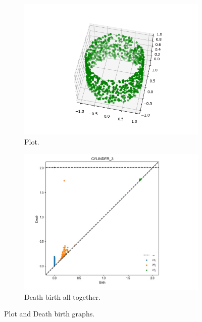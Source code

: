 \documentclass[11pt,a4paper]{report}
\begin{document}
              \begin{figure}[H]
                \centering
                \begin{subfigure}[b]{0.45\linewidth}
                  \includegraphics[width=\linewidth]{./ripser/on_cylinder.png}
                  \caption{Plot.}
                \end{subfigure}
                \begin{subfigure}[b]{0.45\linewidth}
                  \includegraphics[width=\linewidth]{./ripser/on_cylinder_pers_homology.jpg}
                  \caption{Death birth all together.}
                \end{subfigure}
                \caption{Plot and Death birth graphs.}
                \label{fig: plot death}
              \end{figure}
\end{document}

